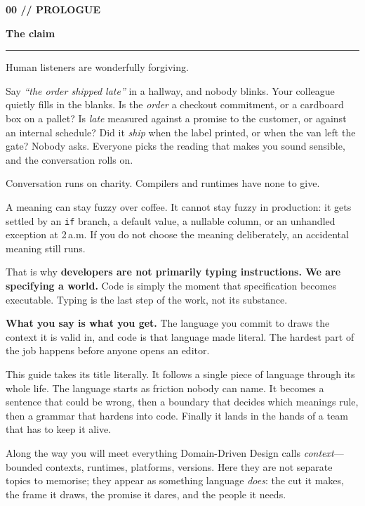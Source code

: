 \documentclass[10pt,a4paper]{article}
\newcounter{movement}
\newcounter{topic}
\newcounter{sub}[movement]
\newcommand{\code}[1]{\texttt{#1}}
\newcommand{\SectionTitle}[2]{%
  {\ttfamily\bfseries\footnotesize\textcolor{G2}{#1}\par}\vspace{1.4mm}%
  {\sffamily\bfseries\fontsize{22}{26}\selectfont #2\par}\vspace{2mm}%
  {\color{Ink}\rule{\linewidth}{1pt}\par}\vspace{4mm}%
}
\begin{document}
\setcounter{page}{1}
{}

\SectionTitle{00 // PROLOGUE}{The claim}

Human listeners are wonderfully forgiving.

Say \emph{“the order shipped late”} in a hallway, and nobody blinks. Your colleague quietly fills in the blanks. Is the \emph{order} a checkout commitment, or a cardboard box on a pallet? Is \emph{late} measured against a promise to the customer, or against an internal schedule? Did it \emph{ship} when the label printed, or when the van left the gate? Nobody asks. Everyone picks the reading that makes you sound sensible, and the conversation rolls on.

Conversation runs on charity. Compilers and runtimes have none to give.

A meaning can stay fuzzy over coffee. It cannot stay fuzzy in production: it gets settled by an \code{if} branch, a default value, a nullable column, or an unhandled exception at 2\,a.m. If you do not choose the meaning deliberately, an accidental meaning still runs.

That is why \textbf{developers are not primarily typing instructions. We are specifying a world.} Code is simply the moment that specification becomes executable. Typing is the last step of the work, not its substance.

\begin{claim}
\textbf{What you say is what you get.} The language you commit to draws the context it is valid in, and code is that language made literal. The hardest part of the job happens before anyone opens an editor.
\end{claim}

This guide takes its title literally. It follows a single piece of language through its whole life. The language starts as friction nobody can name. It becomes a sentence that could be wrong, then a boundary that decides which meanings rule, then a grammar that hardens into code. Finally it lands in the hands of a team that has to keep it alive.

Along the way you will meet everything Domain-Driven Design calls \emph{context}—bounded contexts, runtimes, platforms, versions. Here they are not separate topics to memorise; they appear as something language \emph{does}: the cut it makes, the frame it draws, the promise it dares, and the people it needs.
\end{document}
